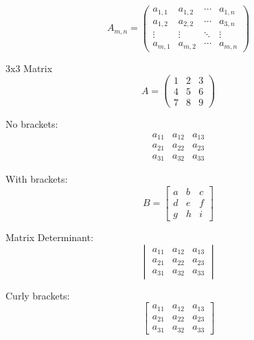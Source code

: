 \documentclass[10pt]{article}
\begin{document}
\begin{equation*}
A_{m,n} = 
\begin{pmatrix}
a_{1,1} 	&	 a_{1,2}	& 	\cdots 	&	 a_{1,n}  \\
a_{1,2} 	&	 a_{2,2} 	& 	\cdots 	&	 a_{3,n} \\
\vdots 	&	 \vdots 	& 	\ddots 	&	 \vdots \\
a_{m,1} 	&	 a_{m,2} 	& 	\cdots 	&	 a_{m,n}
\end{pmatrix}
\end{equation*}

3x3 Matrix
\begin{equation*}
A = 
\begin{pmatrix}
1 & 2 & 3 \\
4 & 5 & 6 \\
7 & 8 & 9
\end{pmatrix}
\end{equation*}

No brackets:
\begin{equation*}
	\begin{matrix}
		a_{11} & a_{12} & a_{13} \\
		a_{21} & a_{22} & a_{23} \\
		a_{31} & a_{32} & a_{33}
	\end{matrix}
\end{equation*}

With brackets:
\begin{equation*}
B=
\begin{bmatrix}
a & b & c \\
d & e & f \\
g & h & i
\end{bmatrix}
\end{equation*}

Matrix Determinant:
\begin{equation*}
	\begin{vmatrix}
		a_{11} & a_{12} & a_{13} \\
		a_{21} & a_{22} & a_{23} \\
		a_{31} & a_{32} & a_{33}
	\end{vmatrix}
\end{equation*}

Curly brackets:
\begin{equation*}
	\begin{bmatrix}
		a_{11} & a_{12} & a_{13} \\
		a_{21} & a_{22} & a_{23} \\
		a_{31} & a_{32} & a_{33}
	\end{bmatrix}
\end{equation*}
\end{document}
